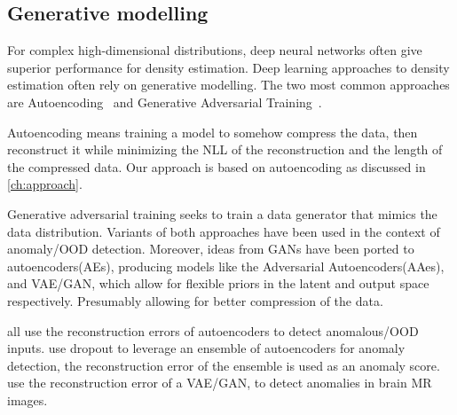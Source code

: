 \documentclass[../main.tex]{subfiles}
\begin{document}

\subsection{Generative modelling}

For complex high-dimensional distributions, deep neural networks often give superior performance for density estimation. Deep learning approaches to density estimation often rely on generative modelling. The two most common approaches are Autoencoding~\cite{kingma2013auto} and Generative Adversarial Training~\cite{goodfellow2014generative}. 

Autoencoding means training a model to somehow compress the data, then reconstruct it while minimizing the NLL of the reconstruction and the length of the compressed data. Our approach is based on autoencoding as discussed in \cref{ch:approach}. 

Generative adversarial training seeks to train a data generator that mimics the data distribution. Variants of both approaches have been used in the context of anomaly/OOD detection. Moreover, ideas from GANs have been ported to autoencoders(AEs), producing models like the Adversarial Autoencoders(AAes)\citep{makhzani2015adversarial}, and VAE/GAN\citep{larsen2015autoencoding}, which allow for flexible priors in the latent and output space respectively. Presumably allowing for better compression of the data.


\citet{xu2018unsupervised, an2015variational, borghesi2019anomaly} all use the reconstruction errors of autoencoders to detect anomalous/OOD inputs. 
\citet{chen2017outlier} use dropout to leverage an ensemble of autoencoders for anomaly detection, the reconstruction error of the ensemble is used as an anomaly score.
\citet{baur2018deep} use the reconstruction error of a VAE/GAN\citep{larsen2015autoencoding}, to detect anomalies in brain MR images. 
\end{document}
